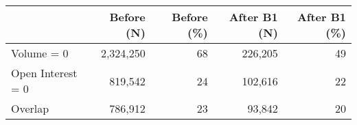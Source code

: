 \begin{tabular}{lrrrr}
\toprule
 & Before (N) & Before (\%) & After B1 (N) & After B1 (\%) \\
\midrule
Volume = 0 & 2,324,250 & 68 & 226,205 & 49 \\
Open Interest = 0 & 819,542 & 24 & 102,616 & 22 \\
Overlap & 786,912 & 23 & 93,842 & 20 \\
\bottomrule
\end{tabular}
